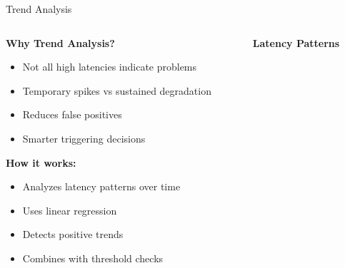 \documentclass[aspectratio=169]{beamer}
\begin{document}
\begin{frame}{Trend Analysis}
    \begin{columns}
        \begin{column}{0.5\textwidth}
            \textbf{Why Trend Analysis?}
            \begin{itemize}
                \item Not all high latencies indicate problems
                \item Temporary spikes vs sustained degradation
                \item Reduces false positives
                \item Smarter triggering decisions
            \end{itemize}
            
            \vspace{0.3cm}
            \textbf{How it works:}
            \begin{itemize}
                \item Analyzes latency patterns over time
                \item Uses linear regression
                \item Detects positive trends
                \item Combines with threshold checks
            \end{itemize}
        \end{column}
        \begin{column}{0.5\textwidth}
            \begin{center}
                \textbf{Latency Patterns}
            \end{center}
        \end{column}
    \end{columns}
\end{frame}
\end{document}
